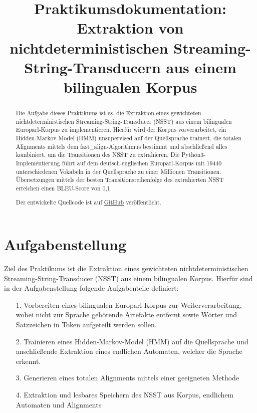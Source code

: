 \documentclass[conference]{IEEEtran}
\title{Praktikumsdokumentation: \\Extraktion von nichtdeterministischen Streaming-String-Transducern aus einem bilingualen Korpus}
\author{\IEEEauthorblockN{Student: \\Alexander Jenke}
\and
\IEEEauthorblockN{Betreuer: \\Thomas Ruprecht, M. Sc.}
\and
\IEEEauthorblockN{Verantwortlicher Hochschullehrer: \\Prof. Dr.-Ing. habil. Heiko Vogler}
}
\begin{document}


\maketitle
\begin{abstract}
Die Aufgabe dieses Praktikums ist es, die Extraktion eines gewichteten nichtdeterministischen Streaming-String-Transducer (NSST) aus einem bilingualen Europarl-Korpus zu implementieren.
Hierfür wird der Korpus vorverarbeitet, ein Hidden-Markov-Model (HMM) unsupervised auf der Quellsprache trainert, die totalen Alignments mittels dem fast\_align-Algorithmus bestimmt und abschließend alles kombiniert, um die Transitionen des NSST zu extrahieren. 
Die Python3-Implementierung führt auf dem deutsch-englischen Europarl-Korpus mit 19440 unterschiedenen Vokabeln in der Quellsprache zu einer Millionen Transitionen.
Übersetzungen mittels der besten Transitionsreihenfolge des extrahierten NSST erreichen einen BLEU-Score von 0,1.

Der entwickelte Quellcode ist auf \hyperlink{https://github.com/AlexanderJenke/nsst}{GitHub} veröffentlicht.
\end{abstract}

\IEEEpeerreviewmaketitle

\section{Aufgabenstellung}
Ziel des Praktikums ist die Extraktion eines gewichteten nichtdeterministischen Streaming-String-Transducer (NSST) aus einem bilingualen Korpus.
Hierfür sind in der Aufgabenstellung folgende Aufgabenteile definiert:

\begin{itemize}
    \item[1.] Vorbereiten eines bilingualen Europarl-Korpus zur Weiterverarbeitung, wobei nicht zur Sprache gehörende Artefakte entfernt sowie Wörter und Satzzeichen in Token aufgeteilt werden sollen.
    \item[2.] Trainieren eines Hidden-Markov-Model (HMM) auf die Quellsprache und anschließende Extraktion eines endlichen Automaten, welcher die Sprache erkennt.
    \item[3.] Generieren eines totalen Alignments mittels einer geeigneten Methode
    \item[4.] Extraktion und lesbares Speichern des NSST aus Korpus, endlichem Automaten und Alignments
\end{itemize}
\end{document}
